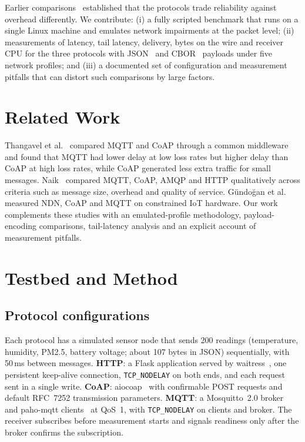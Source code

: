 \documentclass[conference]{IEEEtran}
\begin{document}
Earlier comparisons~\cite{thangavel2014,naik2017,gundogan2018} established that the protocols trade reliability against overhead differently. We contribute: (i) a fully scripted benchmark that runs on a single Linux machine and emulates network impairments at the packet level; (ii) measurements of latency, tail latency, delivery, bytes on the wire and receiver CPU for the three protocols with JSON~\cite{rfc8259} and CBOR~\cite{rfc8949} payloads under five network profiles; and (iii) a documented set of configuration and measurement pitfalls that can distort such comparisons by large factors.

\section{Related Work}
Thangavel et al.~\cite{thangavel2014} compared MQTT and CoAP through a common middleware and found that MQTT had lower delay at low loss rates but higher delay than CoAP at high loss rates, while CoAP generated less extra traffic for small messages. Naik~\cite{naik2017} compared MQTT, CoAP, AMQP and HTTP qualitatively across criteria such as message size, overhead and quality of service. G{\"u}ndo{\u{g}}an et al.~\cite{gundogan2018} measured NDN, CoAP and MQTT on constrained IoT hardware. Our work complements these studies with an emulated-profile methodology, payload-encoding comparisons, tail-latency analysis and an explicit account of measurement pitfalls.

\section{Testbed and Method}
\subsection{Protocol configurations}
Each protocol has a simulated sensor node that sends 200 readings (temperature, humidity, PM2.5, battery voltage; about 107 bytes in JSON) sequentially, with 50\,ms between messages. \textbf{HTTP}: a Flask application served by waitress~\cite{waitress}, one persistent keep-alive connection, \texttt{TCP\_NODELAY} on both ends, and each request sent in a single write. \textbf{CoAP}: aiocoap~\cite{aiocoap} with confirmable POST requests and default RFC~7252 transmission parameters. \textbf{MQTT}: a Mosquitto~2.0 broker~\cite{light2017} and paho-mqtt clients~\cite{paho} at QoS~1, with \texttt{TCP\_NODELAY} on clients and broker. The receiver subscribes before measurement starts and signals readiness only after the broker confirms the subscription.
\end{document}
